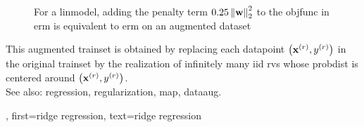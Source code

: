 {{\begin{figure}[H]
\begin{center}
				\caption{For a \gls{linmodel}, adding the penalty term $0.25 \left\Vert {{\bf w}} \right\Vert_{2}^2$ to 
				the \gls{objfunc} in \gls{erm} is equivalent to \gls{erm} on an augmented \gls{dataset}  \label{fig_ridge_regression_dict} }
			\end{center}
		\end{figure} 
		This augmented 
		\gls{trainset} is obtained by replacing each \gls{datapoint} 
		$\left( {\bf x}^{(r)},y^{(r)} \right)$ 
		in the original \gls{trainset} by the \gls{realization} of infinitely 
		many \gls{iid} \glspl{rv} whose \gls{probdist} is centered around 
		$\left( {\bf x}^{(r)},y^{(r)} \right)$.
	    		\\
		See also: \gls{regression}, \gls{regularization}, \gls{map}, \gls{dataaug}.},
	first={ridge regression},
	text={ridge regression}
}


